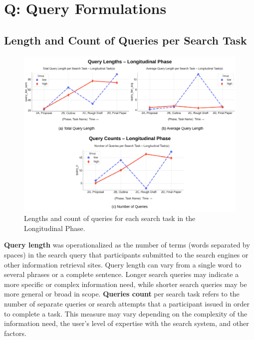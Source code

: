 \documentclass[letterpaper, nobind]{templates/ociamthesis}
\begin{document}
\hypertarget{q-query-formulations}{%
\section{Q: Query Formulations}\label{q-query-formulations}}

\hypertarget{length-and-count-of-queries-per-search-task}{%
\subsection{Length and Count of Queries per Search Task}\label{length-and-count-of-queries-per-search-task}}

\begin{figure}

{\centering \includegraphics[width=1\linewidth]{figs/rp2-query-length-count} 

}

\caption[Query length and counts -- longitudinal phase.]{Lengths and count of queries for each search task in the Longitudinal Phase.}\label{fig:rp2-query-length-count}
\end{figure}





\textbf{Query length} was operationalized as the number of terms (words separated by spaces) in the search query that participants submitted to the search engines or other information retrieval sites.
Query length can vary from a single word to several phrases or a complete sentence.
Longer search queries may indicate a more specific or complex information need, while shorter search queries may be more general or broad in scope.
\textbf{Queries count} per search task refers to the number of separate queries or search attempts that a participant issued in order to complete a task.
This measure may vary depending on the complexity of the information need, the user's level of expertise with the search system, and other factors.
\end{document}
